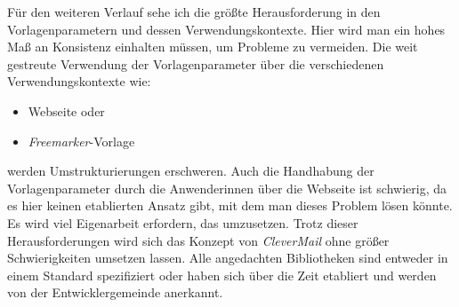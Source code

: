 \newline
\newline
Für den weiteren Verlauf sehe ich die größte Herausforderung in den Vorlagenparametern und dessen Verwendungskontexte. Hier wird man ein hohes Maß an Konsistenz einhalten müssen, um Probleme zu vermeiden. Die weit gestreute Verwendung der Vorlagenparameter über die verschiedenen Verwendungskontexte wie:
\begin{itemize}
	\item Webseite oder
	\item \emph{Freemarker}-Vorlage
\end{itemize} 
werden Umstrukturierungen erschweren. Auch die Handhabung der Vorlagenparameter durch die Anwenderinnen über die Webseite ist schwierig, da es hier keinen etablierten Ansatz gibt, mit dem man dieses Problem lösen könnte. Es wird viel Eigenarbeit erfordern, das umzusetzen. Trotz dieser Herausforderungen wird sich das Konzept von \emph{CleverMail} ohne größer Schwierigkeiten umsetzen lassen. Alle angedachten Bibliotheken sind entweder in einem Standard spezifiziert oder haben sich über die Zeit etabliert und werden von der Entwicklergemeinde anerkannt.